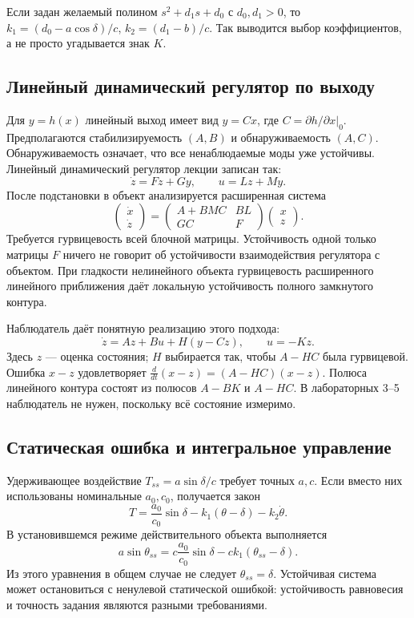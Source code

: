 \addition Если задан желаемый полином $s^2+d_1s+d_0$ с $d_0,d_1>0$, то
$k_1=(d_0-a\cos\delta)/c$, $k_2=(d_1-b)/c$.
Так выводится выбор коэффициентов, а не просто угадывается знак $K$.

\subsection{Линейный динамический регулятор по выходу}

Для $y=h(x)$ линейный выход имеет вид $y=Cx$, где
$C=\left.\partial h/\partial x\right|_0$.
Предполагаются стабилизируемость $(A,B)$ и обнаруживаемость $(A,C)$.
Обнаруживаемость означает, что все ненаблюдаемые моды уже устойчивы.
Линейный динамический регулятор лекции записан так:
\[
  \dot z=Fz+Gy,\qquad u=Lz+My.
\]
После подстановки в объект анализируется расширенная система
\begin{equation}
  \begin{pmatrix}\dot x\\\dot z\end{pmatrix}
  =\begin{pmatrix}A+BMC&BL\\GC&F\end{pmatrix}
   \begin{pmatrix}x\\z\end{pmatrix}.
\end{equation}
Требуется гурвицевость всей блочной матрицы. Устойчивость одной только
матрицы $F$ ничего не говорит об устойчивости взаимодействия регулятора
с объектом. При гладкости нелинейного объекта гурвицевость расширенного
линейного приближения даёт локальную устойчивость полного замкнутого контура.

\addition Наблюдатель даёт понятную реализацию этого подхода:
\[
  \dot z=Az+Bu+H(y-Cz),\qquad u=-Kz.
\]
Здесь $z$ --- оценка состояния; $H$ выбирается так, чтобы $A-HC$ была
гурвицевой. Ошибка $x-z$ удовлетворяет $\frac{d}{dt}(x-z)=(A-HC)(x-z)$.
Полюса линейного контура состоят из полюсов $A-BK$ и $A-HC$.
В лабораторных 3--5 наблюдатель не нужен, поскольку всё состояние измеримо.

\subsection{Статическая ошибка и интегральное управление}

Удерживающее воздействие $T_{ss}=a\sin\delta/c$ требует точных $a,c$.
Если вместо них использованы номинальные $a_0,c_0$, получается закон
\[
  T=\frac{a_0}{c_0}\sin\delta-k_1(\theta-\delta)-k_2\dot\theta.
\]
В установившемся режиме действительного объекта выполняется
\begin{equation}
  a\sin\theta_{ss}
  =c\frac{a_0}{c_0}\sin\delta-ck_1(\theta_{ss}-\delta).
  \label{eq:static-error-pendulum}
\end{equation}
Из этого уравнения в общем случае не следует $\theta_{ss}=\delta$.
Устойчивая система может остановиться с ненулевой статической ошибкой:
устойчивость равновесия и точность задания являются разными требованиями.

